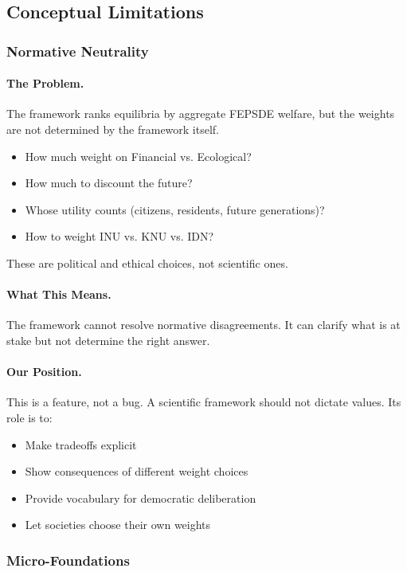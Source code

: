 \documentclass[12pt,a4paper]{article}
\begin{document}
\subsection{Conceptual Limitations}

\subsubsection{Normative Neutrality}

\paragraph{The Problem.}
The framework ranks equilibria by aggregate FEPSDE welfare,
but the weights are not determined by the framework itself.

\begin{itemize}
  \item How much weight on Financial vs. Ecological?
  \item How much to discount the future?
  \item Whose utility counts (citizens, residents, future generations)?
  \item How to weight INU vs. KNU vs. IDN?
\end{itemize}

These are political and ethical choices, not scientific ones.

\paragraph{What This Means.}
The framework cannot resolve normative disagreements.
It can clarify what is at stake but not determine the right answer.

\paragraph{Our Position.}
This is a feature, not a bug. A scientific framework should not
dictate values. Its role is to:
\begin{itemize}
  \item Make tradeoffs explicit
  \item Show consequences of different weight choices
  \item Provide vocabulary for democratic deliberation
  \item Let societies choose their own weights
\end{itemize}

\subsubsection{Micro-Foundations}
\end{document}
